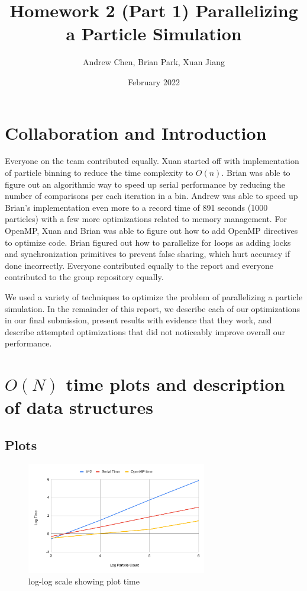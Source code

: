 \documentclass{article}
\title{Homework 2 (Part 1) Parallelizing a Particle Simulation}
\author{Andrew Chen, Brian Park, Xuan Jiang}
\date{February 2022}
\begin{document}
\maketitle
\section{Collaboration and Introduction}
Everyone on the team contributed equally. Xuan started off with implementation of particle binning to reduce the time complexity to $O(n)$. Brian was able to figure out an algorithmic way to speed up serial performance by reducing the number of comparisons per each iteration in a bin. Andrew was able to speed up Brian's implementation even more to a record time of 891 seconds (1000 particles) with a few more optimizations related to memory management. For OpenMP, Xuan and Brian was able to figure out how to add OpenMP directives to optimize code. Brian figured out how to parallelize for loops as adding locks and synchronization primitives to prevent false sharing, which hurt accuracy if done incorrectly. Everyone contributed equally to the report and everyone contributed to the group repository equally.

We used a variety of techniques to optimize the problem of parallelizing a particle simulation.
In the remainder of this report, we describe each of our optimizations in our final submission,
present results with evidence that they work, and describe attempted optimizations that did not
noticeably improve overall our performance.

\section{$O(N)$ time plots and description of data structures} 
\subsection{Plots}

\begin{figure}[H] %
\centering %
\includegraphics[width=0.7\textwidth]{figures/log_plots.pdf} %
\caption{log-log scale showing plot time} %
\label{log-log scale showing plot time} %
\end{figure}
\end{document}
